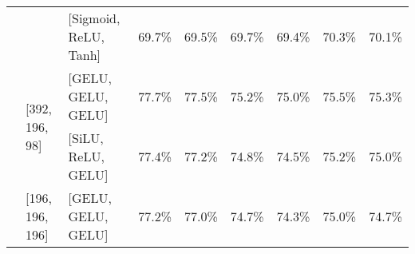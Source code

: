 \begin{table}[!h]
\begin{tabular}{|l|l|l|ll|ll|ll|}
		&                                                                                                   & [Sigmoid, ReLU, Tanh]                                                                               & \multicolumn{1}{l|}{69.7\%}                                                   & 69.5\%                                                         & \multicolumn{1}{l|}{69.7\%}                                                   & 69.4\%                                                         & \multicolumn{1}{l|}{70.3\%}                                                   & 70.1\%                                                         \\ \cline{2-9} 
		& \multirow{2}{*}{[392, 196, 98]}                                                                   & [GELU, GELU, GELU]                                                                                  & \multicolumn{1}{l|}{77.7\%}                                                   & 77.5\%                                                         & \multicolumn{1}{l|}{75.2\%}                                                   & 75.0\%                                                         & \multicolumn{1}{l|}{75.5\%}                                                   & 75.3\%                                                         \\ \cline{3-9} 
		&                                                                                                   & [SiLU, ReLU, GELU]                                                                                  & \multicolumn{1}{l|}{77.4\%}                                                   & 77.2\%                                                         & \multicolumn{1}{l|}{74.8\%}                                                   & 74.5\%                                                         & \multicolumn{1}{l|}{75.2\%}                                                   & 75.0\%                                                         \\ \cline{2-9} 
		& \multirow{2}{*}{[196, 196, 196]}                                                                  & [GELU, GELU, GELU]                                                                                  & \multicolumn{1}{l|}{77.2\%}                                                   & 77.0\%                                                         & \multicolumn{1}{l|}{74.7\%}                                                   & 74.3\%                                                         & \multicolumn{1}{l|}{75.0\%}                                                   & 74.7\%                                                         \\ \cline{3-9} 

\end{tabular}
\end{table}
